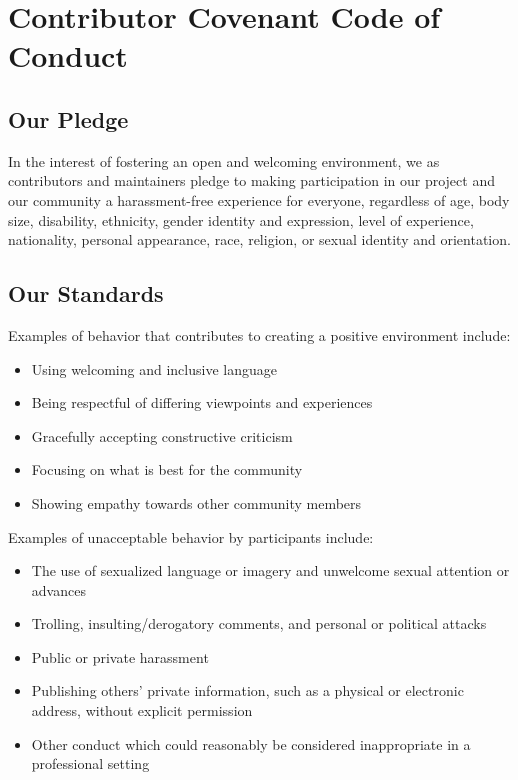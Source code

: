 \documentclass[letterpaper,10pt,english]{sphinxmanual}
\begin{document}
\chapter{Contributor Covenant Code of Conduct}
\label{\detokenize{coc_link:contributor-covenant-code-of-conduct}}\label{\detokenize{coc_link::doc}}

\section{Our Pledge}
\label{\detokenize{coc_link:our-pledge}}
In the interest of fostering an open and welcoming environment, we as contributors and maintainers pledge to making participation in our project and our community a harassment-free experience for everyone, regardless of age, body size, disability, ethnicity, gender identity and expression, level of experience, nationality, personal appearance, race, religion, or sexual identity and orientation.


\section{Our Standards}
\label{\detokenize{coc_link:our-standards}}
Examples of behavior that contributes to creating a positive environment include:
\begin{itemize}
\item {} 
Using welcoming and inclusive language

\item {} 
Being respectful of differing viewpoints and experiences

\item {} 
Gracefully accepting constructive criticism

\item {} 
Focusing on what is best for the community

\item {} 
Showing empathy towards other community members

\end{itemize}

Examples of unacceptable behavior by participants include:
\begin{itemize}
\item {} 
The use of sexualized language or imagery and unwelcome sexual attention or advances

\item {} 
Trolling, insulting/derogatory comments, and personal or political attacks

\item {} 
Public or private harassment

\item {} 
Publishing others’ private information, such as a physical or electronic address, without explicit permission

\item {} 
Other conduct which could reasonably be considered inappropriate in a professional setting

\end{itemize}
\end{document}

